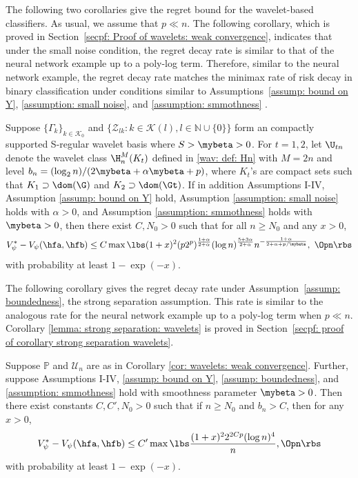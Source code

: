\documentclass[preprint] {imsart}
\begin{document}
The following two corollaries give the regret bound for the wavelet-based classifiers. As usual, we assume that $p\ll n$.
The following corollary, which is proved in Section~\ref{secpf: Proof of wavelets: weak convergence}, indicates that under the small noise condition, the regret decay rate is similar to that of the neural network example up to a poly-log term. Therefore, similar to the neural network example, the regret decay rate matches the minimax rate of risk decay in binary classification under  conditions similar to Assumptions~\ref{assump: bound on Y}, \ref{assumption: small noise}, and \ref{assumption: smmothness} \citep{audibert2007}.
\begin{corollary}
\label{cor: wavelets: weak convergence}
Suppose  $\{{\Gamma}_{k}\}_{k\in\mathcal K_0}$ and  $\{\mathcal{Z}_{lk}:{k\in\mathcal K(l), l\in\mathbb{N}\cup \{0\}}\}$ form an compactly supported S-regular wavelet basis  where $S>\mybeta>0$.
For $t=1,2$, let $\U_{tn}$ denote the  wavelet class  $\H_n^{M}(K_t)$ defined in \eqref{wav: def: Hn} with $M=2n$ and level $b_n=(\log_2n)/(2\mybeta+\alpha\mybeta+p)$, where $K_t$'s are  compact sets such that $K_1\supset \dom(\G)$ and $K_2\supset \dom(\Gt)$. If in addition Assumptions I-IV, Assumption \ref{assump: bound on Y} hold, Assumption \ref{assumption: small noise} holds with $\alpha>0$, and Assumption \ref{assumption: smmothness} holds with $\mybeta>0$, then there exist $C,N_0>0$ such that for all  $n\geq N_0$ and any $x>0$,
\[V_\psi^*-V_\psi(\hfa,\hfb)\leq C\max\lbs  (1+x)^2(p2^p)^{\frac{1+\alpha}{2+\alpha}}(\log n)^{\frac{5+3\alpha}{2+\alpha}}n^{-\frac{1+\alpha}{2+\alpha+p/\mybeta}},\ \Opn\rbs\]
with probability at least $1-\exp(-x)$.
\end{corollary}

The following corollary gives the regret decay rate under Assumption~\ref{assump: boundedness},  the strong separation assumption. This rate is similar to the analogous rate for the neural network example up to a poly-log term when $p\ll n$. Corollary \ref{lemma: strong separation: wavelets} is proved in Section~\ref{secpf: proof of corollary strong separation wavelets}.
\begin{corollary}
\label{lemma: strong separation: wavelets}
Suppose $\mathbb P$ and $\mathcal U_n$ are as in Corollary \ref{cor: wavelets: weak convergence}. Further, suppose  Assumptions I-IV, \ref{assump: bound on Y},  \ref{assump: boundedness}, and \ref{assumption: smmothness} hold with smoothness parameter $\mybeta>0$. Then there exist constants $C,C',N_0>0$ such that if $n\geq N_0$ and $b_n>C$, then for  any $x>0$,
\[V_\psi^*-V_\psi(\hfa,\hfb)\leq C'\max\lbs \frac{(1+x)^22^{2Cp}(\log n)^4}{n},\Opn\rbs\]
 with probability at least $1-\exp(-x)$.
\end{corollary}
\end{document}

